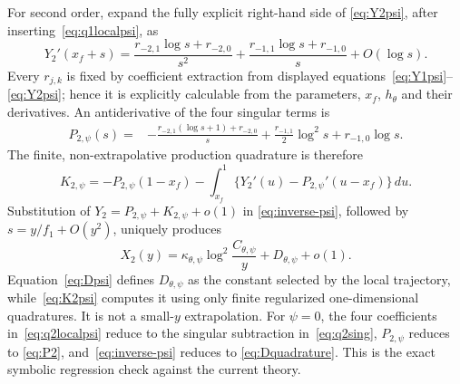 \documentclass[11pt,a4paper]{article}
\begin{document}
For second order, expand the fully explicit right-hand side of
\eqref{eq:Y2psi}, after inserting~\eqref{eq:q1localpsi}, as
\begin{equation}
 Y_2'(x_f+s)=\frac{r_{-2,1}\log s+r_{-2,0}}{s^2}
 +\frac{r_{-1,1}\log s+r_{-1,0}}s+O(\log s).
 \label{eq:q2localpsi}
\end{equation}
Every $r_{j,k}$ is fixed by coefficient extraction from displayed
equations~\eqref{eq:Y1psi}--\eqref{eq:Y2psi}; hence it is explicitly
calculable from the parameters, $x_f$, $h_\theta$ and their derivatives.
An antiderivative of the four singular terms is
\begin{align}
 P_{2,\psi}(s)={}&-\frac{r_{-2,1}(\log s+1)+r_{-2,0}}s
 +\frac{r_{-1,1}}2\log^2s+r_{-1,0}\log s.
\end{align}
The finite, non-extrapolative production quadrature is therefore
\begin{equation}
 K_{2,\psi}=-P_{2,\psi}(1-x_f)
 -\int_{x_f}^1\{Y_2'(u)-P_{2,\psi}'(u-x_f)\}\,du.
 \label{eq:K2psi}
\end{equation}
Substitution of $Y_2=P_{2,\psi}+K_{2,\psi}+o(1)$ in
\eqref{eq:inverse-psi}, followed by $s=y/f_1+O(y^2)$, uniquely produces
\begin{equation}
 X_2(y)=\kappa_{\theta,\psi}
 \log^2\!\frac{C_{\theta,\psi}}y+D_{\theta,\psi}+o(1).
 \label{eq:Dpsi}
\end{equation}
Equation~\eqref{eq:Dpsi} defines $D_{\theta,\psi}$ as the constant selected by
the local trajectory, while~\eqref{eq:K2psi} computes it using only finite
regularized one-dimensional quadratures.  It is not a small-$y$ extrapolation.
For $\psi=0$, the four coefficients in~\eqref{eq:q2localpsi} reduce to the
singular subtraction in~\eqref{eq:q2sing}, $P_{2,\psi}$ reduces to
\eqref{eq:P2}, and~\eqref{eq:inverse-psi} reduces to
\eqref{eq:Dquadrature}.  This is the exact symbolic regression check against
the current theory.
\end{document}

